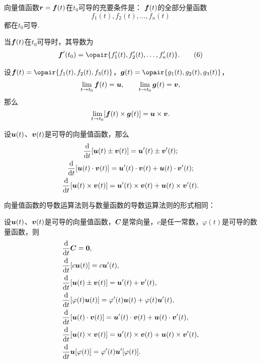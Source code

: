 \begin{theorem}
向量值函数\(\boldsymbol{r}=\boldsymbol{f}(t)\)在\(t_0\)可导的充要条件是：
\(\boldsymbol{f}(t)\)的全部分量函数\[
f_1(t),f_2(t),\dotsc,f_n(t)
\]都在\(t_0\)可导.

当\(\boldsymbol{f}(t)\)在\(t_0\)可导时，其导数为
\begin{gather}
\mat{f}'(t_0)=\opair{f_1'(t),f_2'(t),\dotsc,f_n'(t)}.
\tag6
\end{gather}
\end{theorem}

\begin{theorem}
\def\l{\lim\limits_{t \to t_0}}
设\(\mat{f}(t) = \opair{f_1(t),f_2(t),f_3(t)}\)，\(\mat{g}(t) = \opair{g_1(t),g_2(t),g_3(t)}\)，\[
\l \mat{f}(t) = \mat{u},
\qquad
\l \mat{g}(t) = \mat{v},
\]那么\[
\l [\mat{f}(t) \times \mat{g}(t)]
= \mat{u} \times \mat{v}.
\]
\end{theorem}

\begin{theorem}
设\(\boldsymbol{u}(t)\)、\(\boldsymbol{v}(t)\)是可导的向量值函数，那么\begin{gather}
\dv{t} [\boldsymbol{u}(t) \pm \boldsymbol{v}(t)] = \boldsymbol{u}'(t) \pm \boldsymbol{v}'(t); \\
\dv{t} [\boldsymbol{u}(t) \cdot \boldsymbol{v}(t)] = \boldsymbol{u}'(t) \cdot \boldsymbol{v}(t) + \boldsymbol{u}(t) \cdot \boldsymbol{v}'(t); \\
\dv{t} [\boldsymbol{u}(t) \times \boldsymbol{v}(t)] = \boldsymbol{u}'(t) \times \boldsymbol{v}(t) + \boldsymbol{u}(t) \times \boldsymbol{v}'(t).
\end{gather}
\end{theorem}

向量值函数的导数运算法则与数量函数的导数运算法则的形式相同：
\begin{theorem}[向量值函数的导数运算法则]
设\(\boldsymbol{u}(t)\)、\(\boldsymbol{v}(t)\)是可导的向量值函数，\(\boldsymbol{C}\)是常向量，\(c\)是任一常数，\(\varphi(t)\)是可导的数量函数，则\begin{align}
&\dv{t} \boldsymbol{C} = \boldsymbol{0}, \\
&\dv{t} [c \boldsymbol{u}(t)] = c \boldsymbol{u}'(t), \\
&\dv{t} [\boldsymbol{u}(t) \pm \boldsymbol{v}(t)] = \boldsymbol{u}'(t) + \boldsymbol{v}'(t), \\
&\dv{t} [\varphi(t) \boldsymbol{u}(t)] = \varphi'(t) \boldsymbol{u}(t) + \varphi(t) \boldsymbol{u}'(t), \\
&\dv{t} [\boldsymbol{u}(t) \cdot \boldsymbol{v}(t)] = \boldsymbol{u}'(t) \cdot \boldsymbol{v}(t) + \boldsymbol{u}(t) \cdot \boldsymbol{v}'(t), \\
&\dv{t} [\boldsymbol{u}(t) \times \boldsymbol{v}(t)] = \boldsymbol{u}'(t) \times \boldsymbol{v}(t) + \boldsymbol{u}(t) \times \boldsymbol{v}'(t), \\
&\dv{t} \boldsymbol{u}[\varphi(t)] = \varphi'(t) \boldsymbol{u}'[\varphi(t)].
\end{align}
\end{theorem}

